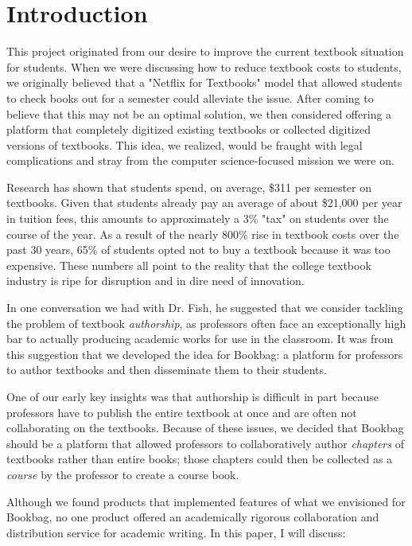 \documentclass[pageno]{jpaper}
\begin{document}
\section{Introduction}

This project originated from our desire to improve the current textbook situation for students. When we were discussing how to reduce textbook costs to students, we originally believed that a "Netflix for Textbooks" model that allowed students to check books out for a semester could alleviate the issue. After coming to believe that this may not be an optimal solution, we then considered offering a platform that completely digitized existing textbooks or collected digitized versions of textbooks. This idea, we realized, would be fraught with legal complications and stray from the computer science-focused mission we were on.

Research has shown that students spend, on average, \$311 per semester on textbooks. Given that students already pay an average of about \$21,000 per year in tuition fees, this amounts to approximately a 3\% "tax" on students over the course of the year. As a result of the nearly 800\% rise in textbook costs over the past 30 years, 65\% of students opted not to buy a textbook because it was too expensive. These numbers all point to the reality that the college textbook industry is ripe for disruption and in dire need of innovation.

In one conversation we had with Dr. Fish, he suggested that we consider tackling the problem of textbook \textit{authorship}, as professors often face an exceptionally high bar to actually producing academic works for use in the classroom. It was from this suggestion that we developed the idea for Bookbag: a platform for professors to author textbooks and then disseminate them to their students.

One of our early key insights was that authorship is difficult in part because professors have to publish the entire textbook at once and are often not collaborating on the textbooks. Because of these issues, we decided that Bookbag should be a platform that allowed professors to collaboratively author \textit{chapters} of textbooks rather than entire books; those chapters could then be collected as a \textit{course} by the professor to create a course book.

Although we found products that implemented features of what we envisioned for Bookbag, no one product offered an academically rigorous collaboration and distribution service for academic writing. In this paper, I will discuss:
\end{document}
